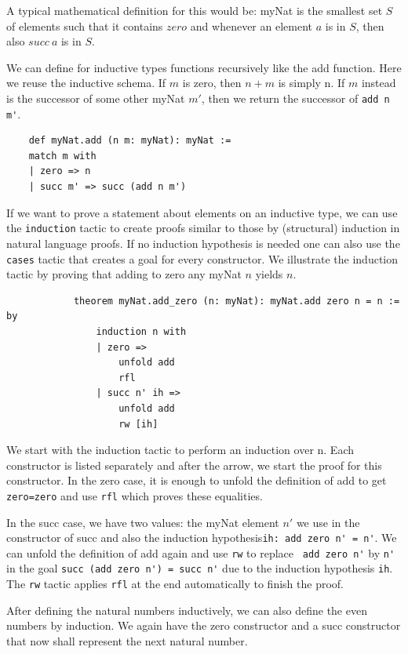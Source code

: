 A typical mathematical definition for this would be: myNat is the smallest set $S$ of elements such that it contains $zero$ and whenever an element $a$ is in $S$, then also $succ\ a$ is in $S$.

We can define for inductive types functions recursively like the add function. Here we reuse the inductive schema. If $m$ is zero, then $n+m$ is simply n. If $m$ instead is the successor of some other myNat $m'$, then we return the successor of \lstinline|add n m'|.

\begin{lstlisting}
    def myNat.add (n m: myNat): myNat :=
    match m with
    | zero => n
    | succ m' => succ (add n m')
\end{lstlisting}

If we want to prove a statement about elements on an inductive type, we can use the \lstinline|induction| tactic to create proofs similar to those by (structural) induction in natural language proofs. If no induction hypothesis is needed one can also use the \lstinline|cases| tactic that creates a goal for every constructor. We illustrate the induction tactic by proving that adding to zero any myNat $n$ yields $n$.

\begin{lstlisting}
            theorem myNat.add_zero (n: myNat): myNat.add zero n = n := by
                induction n with
                | zero =>
                    unfold add
                    rfl
                | succ n' ih =>
                    unfold add
                    rw [ih]
\end{lstlisting}

We start with the induction tactic to perform an induction over n. Each constructor is listed separately and after the arrow, we start the proof for this constructor. In the zero case, it is enough to unfold the definition of add to get \lstinline|zero=zero| and use \lstinline|rfl| which proves these equalities.

In the succ case, we have two values:  the myNat element $n'$ we use in the constructor of succ and also the induction hypothesis\lstinline|ih: add zero n' = n'|. We can unfold the definition of add again and use \lstinline|rw| to replace \lstinline| add zero n'| by \lstinline|n'| in the goal \lstinline|succ (add zero n') = succ n'| due to the induction hypothesis \lstinline|ih|. The \lstinline|rw| tactic applies \lstinline|rfl| at the end automatically to finish the proof.

After defining the natural numbers inductively, we can also define the even numbers by induction. We again have the zero constructor and a succ constructor that now shall represent the next natural number.

